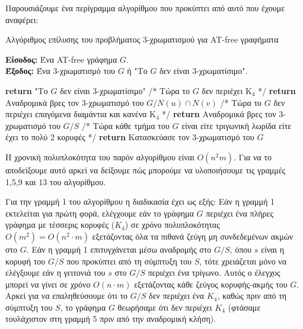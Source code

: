 Παρουσιάζουμε ένα περίγραμμα αλγορίθμου που προκύπτει από αυτό που έχουμε αναφέρει:
\begin{algorithm}[H]
	\caption{Αλγόριθμος επίλυσης του προβλήματος 3-χρωματισμού για AT-free γραφήματα}
	\label{alg:coloring}
	
	\hspace*{\algorithmicindent} \textbf{Είσοδος:} Ένα AT-free γράφημα $G$.\\
	
	\hspace*{\algorithmicindent} \textbf{Έξοδος:} Ένα 3-χρωματισμό του $G$ ή "Το $G$ δεν είναι 3-χρωματίσιμο".
	
	\begin{algorithmic}[1]
		
		\STATE \textbf{return} "Το $G$ δεν είναι 3-χρωματίσιμο"
		\ENDIF
		\STATE /* Τώρα το $G$ δεν περιέχει $\text{Κ}_{\text{4}}$ */
		\STATE \textbf{return} Αναδρομικά βρες τον 3-χρωματισμό του $G/N(u) \cap N(v)$
		\ENDIF
		\STATE /* Τώρα το $G$ δεν περιέχει επαγόμενα διαμάντια και κανένα $\text{Κ}_{\text{4}}$ */
		\STATE \textbf{return} Αναδρομικά βρες τον 3-χρωματισμό του $G/S$
		\ENDIF
		\STATE /* Τώρα κάθε τμήμα του $G$ είναι είτε τριγωνική λωρίδα είτε έχει το πολύ 2 κορυφές */
		\STATE \textbf{return} Κατασκεύασε τον 3-χρωματισμό του $G$
	\end{algorithmic}
\end{algorithm}

Η χρονική πολυπλοκότητα του παρόν αλγορίθμου είναι $O(n^2m)$. Για να το αποδείξουμε αυτό αρκεί να δείξουμε πώς μπορούμε να υλοποιήσουμε τις γραμμές 1,5,9 και 13 του αλγορίθμου.

Για την γραμμή 1 του αλγορίθμου η διαδικασία έχει ως εξής: Εάν η γραμμή 1 εκτελείται για πρώτη φορά, ελέγχουμε εάν το γράφημα $G$ περιέχει ένα πλήρες γράφημα με τέσσερις κορυφές ($K_4$) σε χρόνο πολυπλοκότητας $O(m^2) = O(n^2 \cdot m)$ εξετάζοντας όλα τα πιθανά ζεύγη μη συνδεδεμένων ακμών στο $G$. Εάν η γραμμή 1 επιτυγχάνεται μέσω αναδρομής στο $G/S$, όπου $s$ είναι η κορυφή του $G/S$ που προκύπτει από τη σύμπτυξη του $S$, τότε χρειάζεται μόνο να ελέγξουμε εάν η γειτονιά του $s$ στο $G/S$ περιέχει ένα τρίγωνο. Αυτός ο έλεγχος μπορεί να γίνει σε χρόνο $O(n \cdot m)$ εξετάζοντας κάθε ζεύγος κορυφής-ακμής του $G$. Αρκεί για να επαληθεύσουμε ότι το $G/S$ δεν περιέχει ένα $K_4$, καθώς πριν από τη σύμπτυξη του $S$, το γράφημα $G$ θεωρήσαμε ότι δεν περιέχει $K_4$ (φτάσαμε τουλάχιστον στη γραμμή 5 πριν από την αναδρομική κλήση).

